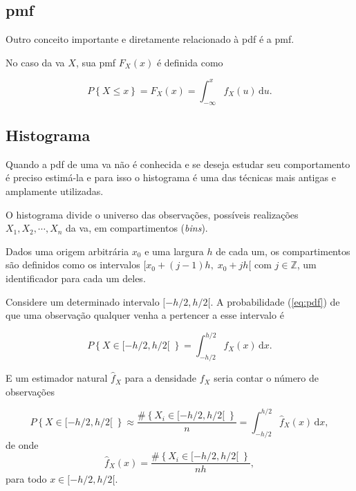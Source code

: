 \subsection{\Glsdesc{pmf}}
\label{sec:pmf}

Outro conceito importante e diretamente relacionado à \gls{pdf} é a
\gls{pmf}.

No caso da \gls{va} $X$, sua \gls{pmf} $F_X(x)$ é definida como

\begin{equation}
	P \left\{ X \leq x\right\} = F_X(x) = \int_{-\infty}^{x}\!f_X(u)\,\mathrm{d}u.
	\label{eq:pmf}
\end{equation}



\subsection{Histograma}
\label{sec:histogram}

Quando a \gls{pdf} de uma \gls{va} não é conhecida e se deseja estudar seu comportamento
é preciso estimá-la e para isso o histograma é uma das técnicas mais antigas e amplamente utilizadas.

O histograma divide o universo das observações, possíveis realizações $X_1, X_2,\cdots, X_n$
da \gls{va}, em compartimentos (\emph{bins}).

Dados uma origem arbitrária $x_0$ e uma largura $h$ de cada um, os compartimentos
são definidos como os intervalos $[x_0 + (j -1)h,\; x_0 + jh[$ 
com $j\in\mathbb{Z}$, um identificador para cada um deles. 

Considere um determinado intervalo $[-h/2, h/2[$. 
A probabilidade (\eqref{eq:pdf}) de que uma observação qualquer venha a pertencer a esse intervalo é

\begin{equation}
	P \left\{ X \in [-h/2,h/2[ \; \right\} = \int_{-h/2}^{h/2}\!f_X(x)\,\mathrm{d}x.
	\label{eq:hist01}
\end{equation}

E um estimador natural $\hat{f}_X$ para a densidade $f_X$ seria contar o número de observações

\begin{equation}
	P \left\{ X \in [-h/2,h/2[ \; \right\} \approx \frac{\# \left\{ X_i \in [-h/2,h/2[ \; \right\}}{n} =
	\int_{-h/2}^{h/2}\!\hat{f}_X(x)\,\mathrm{d}x ,
	\label{eq:hist02}
\end{equation}
de onde 
\begin{equation}
	\hat{f}_X(x) = \frac{\# \left\{ X_i \in [-h/2,h/2[ \; \right\}}{nh},
	\label{eq:hist_03}
\end{equation}
para todo $x \in [-h/2,h/2[$.

